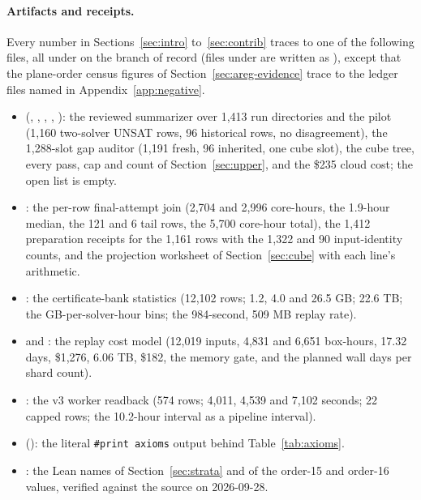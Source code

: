 \documentclass{anvil-paper}
\theoremstyle{definition}
\begin{document}
\paragraph{Artifacts and receipts.}\label{sec:artifacts}
Every number in Sections~\ref{sec:intro} to~\ref{sec:contrib} traces to one of the following files, all under  on the branch of record (files under  are written as ), except that the plane-order census figures of Section~\ref{sec:areg-evidence} trace to the ledger files named in Appendix~\ref{app:negative}.
\begin{itemize}\raggedright
\item {} (, , , , ): the reviewed summarizer over 1,413 run directories and the pilot (1,160 two-solver UNSAT rows, 96 historical rows, no disagreement), the 1,288-slot gap auditor (1,191 fresh, 96 inherited, one cube slot), the cube tree, every pass, cap and count of Section~\ref{sec:upper}, and the \$235 cloud cost; the open list is empty.
\item {}: the per-row final-attempt join (2,704 and 2,996 core-hours, the 1.9-hour median, the 121 and 6 tail rows, the 5,700 core-hour total), the 1,412 preparation receipts for the 1,161 rows with the 1,322 and 90 input-identity counts, and the projection worksheet of Section~\ref{sec:cube} with each line's arithmetic.
\item {}: the certificate-bank statistics (12,102 rows; 1.2, 4.0 and 26.5 GB; 22.6 TB; the GB-per-solver-hour bins; the 984-second, 509 MB replay rate).
\item {} and : the replay cost model (12,019 inputs, 4,831 and 6,651 box-hours, 17.32 days, \$1,276, 6.06 TB, \$182, the memory gate, and the planned wall days per shard count).
\item {}: the v3 worker readback (574 rows; 4,011, 4,539 and 7,102 seconds; 22 capped rows; the 10.2-hour interval as a pipeline interval).
\item {} (): the literal \texttt{\#print axioms} output behind Table~\ref{tab:axioms}.
\item {}: the Lean names of Section~\ref{sec:strata} and of the order-15 and order-16 values, verified against the source on 2026-09-28.

\end{itemize}
\end{document}
